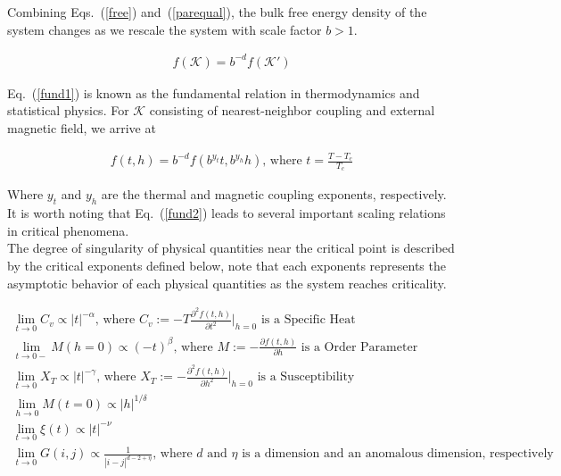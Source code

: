 \documentclass[%
 reprint,
 amsmath,amssymb,
 aps,
]{revtex4-2}
\begin{document}
Combining Eqs.~(\ref{free}) and~(\ref{parequal}), the bulk free energy density of 
the system changes as we rescale the system with scale factor $b > 1$.

\begin{eqnarray}
f(\mathcal{K}) = b^{-d}f(\mathcal{K}') \label{fund1}
\end{eqnarray}

Eq.~(\ref{fund1}) is known as the fundamental relation in thermodynamics and statistical 
physics. For $\mathcal{K}$ consisting of nearest-neighbor coupling and external magnetic 
field, we arrive at

\begin{eqnarray}
f(t,h) = b^{-d}f(b^{y_{t}}t, b^{y_{h}}h) \text{, where } t = \frac{T-T_{c}}{T_{c}} 
\label{fund2}
\end{eqnarray}

Where $y_{t}$ and $y_{h}$ are the thermal and magnetic coupling exponents, respectively.
It is worth noting that Eq.~(\ref{fund2}) leads to several important scaling relations 
in critical phenomena. \\

The degree of singularity of physical quantities near the critical point is described 
by the critical exponents defined below, note that each exponents represents the asymptotic 
behavior of each physical quantities as the system reaches criticality.

\begin{widetext}
\begin{gather}
\lim_{t \rightarrow 0} C_{v} \propto |t|^{-\alpha} \text{, where } C_{v} := 
-T \frac{\partial^{2} f(t,h)}{\partial t^{2}}\bigg|_{h=0} \text{ is a Specific Heat} 
\label{alpha} \\
\lim_{t \rightarrow 0-} M(h=0) \propto (-t)^{\beta} \text{, where } M := 
- \frac{\partial f(t,h)}{\partial h} \text{ is a Order Parameter} \label{beta} \\
\lim_{t \rightarrow 0} X_{T} \propto |t|^{-\gamma} \text{, where } X_{T} := 
-\frac{\partial^{2} f(t,h)}{\partial h^{2}}\bigg|_{h=0} \text{ is a Susceptibility} 
\label{gamma} \\
\lim_{h \rightarrow 0} M(t=0) \propto |h|^{1/\delta} \label{delta} \\
\lim_{t \rightarrow 0} \xi(t) \propto |t|^{-\nu} \label{nu} \\
\lim_{t \rightarrow 0} G(i,j) \propto \frac{1}{|i-j|^{d-2+\eta}} 
\text{, where } d \text{ and } \eta \text{ is a dimension and an anomalous dimension, 
respectively} \label{eta}
\end{gather}
\end{widetext}
\end{document}

